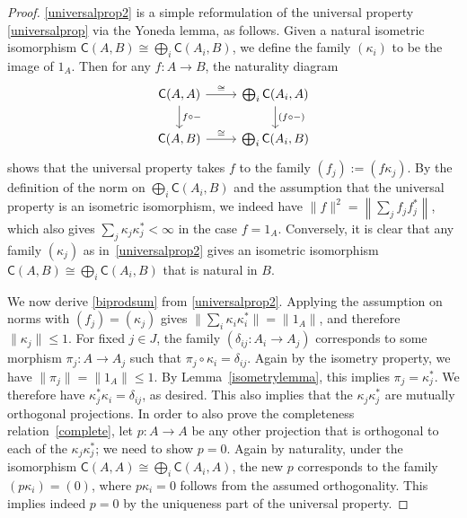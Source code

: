 \documentclass[reqno,T1]{amsproc}
\newcommand{\cat}[1]{\mathsf{#1}}		%
\newcommand{\id}[1]{1_{#1}}			%
\theoremstyle{plain}
\theoremstyle{remark}
\numberwithin{equation}{section}
\begin{document}
\begin{proof}
\ref{universalprop2} is a simple reformulation of the universal property \ref{universalprop} via the Yoneda lemma, as follows. Given a natural isometric isomorphism $\cat{C}(A,B) \cong \bigoplus_i \cat{C}(A_i,B)$, we define the family $(\kappa_i)$ to be the image of $\id{A}$. Then for any $f : A \to B$, the naturality diagram
\[\begin{tikzcd}
	\cat{C}(A,A) \ar{r}{\cong} \ar{d}{f\circ -} & \bigoplus_i \cat{C}(A_i,A) \ar{d}{(f\circ -)} \\
	\cat{C}(A,B) \ar{r}{\cong} & \bigoplus_i \cat{C}(A_i,B)
\end{tikzcd}\]
shows that the universal property takes $f$ to the family $(f_j) := (f\kappa_j)$. By the definition of the norm on $\bigoplus_i \cat{C}(A_i,B)$ and the assumption that the universal property is an isometric isomorphism, we indeed have $\| f \|^2 = \left\| \sum_j f_j f_j^* \right\|$, which also gives $\sum_j \kappa_j \kappa_j^* < \infty$ in the case $f = \id{A}$. Conversely, it is clear that any family $(\kappa_j)$ as in~\ref{universalprop2} gives an isometric isomorphism $\cat{C}(A,B) \cong \bigoplus_i \cat{C}(A_i,B)$ that is natural in $B$.

We now derive \ref{biprodsum} from \ref{universalprop2}. Applying the assumption on norms with $(f_j) = (\kappa_j)$ gives $\| \sum_i \kappa_i \kappa_i^* \| = \| \id{A} \|$, and therefore $\| \kappa_j \| \leq 1$. For fixed $j\in J$, the family $(\delta_{ij} : A_i \to A_j)$ corresponds to some morphism $\pi_j : A \to A_j$ such that $\pi_j\circ\kappa_i = \delta_{ij}$. Again by the isometry property, we have $\| \pi_j \| = \| \id{A} \| \leq 1$. By Lemma~\ref{isometrylemma}, this implies $\pi_j = \kappa_j^*$. We therefore have $\kappa_j^*\kappa_i = \delta_{ij}$, as desired. This also implies that the $\kappa_j \kappa_j^*$ are mutually orthogonal projections. In order to also prove the completeness relation~\eqref{complete}, let $p : A\to A$ be any other projection that is orthogonal to each of the $\kappa_j \kappa_j^*$; we need to show $p = 0$. Again by naturality, under the isomorphism $\cat{C}(A,A) \cong \bigoplus_i \cat{C}(A_i,A)$, the new $p$ corresponds to the family $(p\kappa_i) = (0)$, where $p\kappa_i = 0$ follows from the assumed orthogonality. This implies indeed $p=0$ by the uniqueness part of the universal property.


\end{proof}
\end{document}
